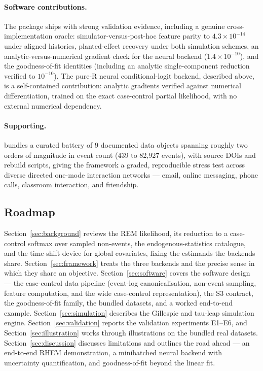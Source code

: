 \paragraph{Software contributions.}
The package ships with strong validation evidence, including a genuine
cross-implementation oracle: simulator-versus-post-hoc feature parity to
$4.3\times10^{-14}$ under aligned histories, planted-effect recovery under both
simulation schemes, an analytic-versus-numerical gradient check for the neural
backend ($1.4\times10^{-10}$), and the goodness-of-fit identities (including an
analytic single-component reduction verified to $10^{-10}$). The
pure-R neural conditional-logit backend, described above, is a self-contained
contribution: analytic gradients verified against numerical differentiation,
trained on the exact case-control partial likelihood, with no external
numerical dependency.

\paragraph{Supporting.}
 bundles a curated battery of 9 documented data objects spanning
roughly two orders of magnitude in event count (439 to 82{,}927 events), with
source DOIs and rebuild scripts, giving the framework a graded, reproducible
stress test across diverse directed one-mode interaction networks --- email,
online messaging, phone calls, classroom interaction, and friendship.

\subsection{Roadmap}
\label{sec:roadmap}

Section~\ref{sec:background} reviews the REM likelihood, its reduction to a
case-control softmax over sampled non-events, the endogenous-statistics
catalogue, and the time-shift device for global covariates, fixing the
estimands the backends share. Section~\ref{sec:framework} treats the three
backends and the precise sense in which they share an objective.
Section~\ref{sec:software} covers the software design --- the case-control
data pipeline (event-log canonicalisation, non-event sampling, feature
computation, and the wide case-control representation), the  S3
contract, the goodness-of-fit family, the bundled datasets, and a worked
end-to-end example. Section~\ref{sec:simulation} describes the Gillespie and
tau-leap simulation engine. Section~\ref{sec:validation} reports the
validation experiments E1--E6, and Section~\ref{sec:illustration} works
through illustrations on the bundled real datasets.
Section~\ref{sec:discussion} discusses limitations and outlines
the road ahead --- an end-to-end RHEM demonstration, a minibatched neural
backend with uncertainty quantification, and goodness-of-fit beyond the linear
fit.
